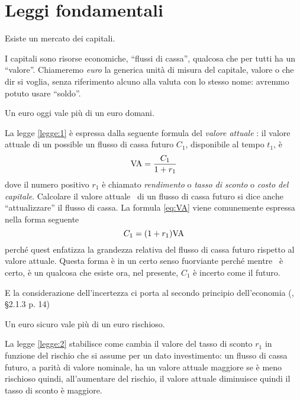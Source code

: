 
\chapter{Leggi fondamentali}
\label{chap:Leggi_fondamentali}

\begin{legge}\label{law:0}
  Esiste un mercato dei capitali.
\end{legge}

I capitali sono risorse economiche, ``flussi di cassa'', qualcosa che per tutti ha un ``valore''.
Chiameremo \emph{euro} la generica unità di misura del capitale, valore o che dir si voglia, senza
riferimento alcuno alla valuta con lo stesso nome: avremmo potuto usare ``soldo''.

\begin{legge}\label{legge:1}
  Un euro oggi vale più di un euro domani.
\end{legge}

La legge \ref{legge:1} è espressa dalla seguente formula del \emph{valore attuale}
\VA: il valore attuale di un possible un flusso di cassa futuro $C_1$, disponibile
al tempo $t_1$, è
\begin{equation}
  \label{eq:VA}
  \mathrm{VA}=\frac{C_1}{1+r_1}
\end{equation}
dove il numero positivo $r_1$ è chiamato \emph{rendimento} o \emph{tasso di sconto} o
\emph{costo del capitale}. Calcolare il valore attuale \VA\ di un flusso di cassa futuro
si dice anche ``attualizzare'' il flusso di cassa.
La formula \eqref{eq:VA} viene comunemente espressa nella forma seguente
\[
  C_1=(1+r_1)\mathrm{VA}
\]
perché quest enfatizza la grandezza relativa del flusso di cassa futuro rispetto al valore attuale.
Questa forma è in un certo senso fuorviante perché mentre \VA\ è certo, è un qualcosa che esiste ora,
nel presente, $C_1$ è incerto come il futuro.

E la considerazione dell'incertezza ci porta al secondo
principio dell'economia (\cite{brealey_et_al1999}, §2.1.3 p. 14)

\begin{legge}\label{legge:2}
  Un euro sicuro vale più di un euro rischioso.  
\end{legge}

La legge \ref{legge:2} stabilisce come cambia il valore del tasso di sconto $r_1$ in funzione del
rischio che si assume per un dato investimento: un flusso di cassa futuro, a parità di valore nominale,
ha un valore attuale maggiore se è meno rischioso quindi, all'aumentare del rischio, il valore attuale
diminuisce quindi il tasso di sconto è maggiore.

